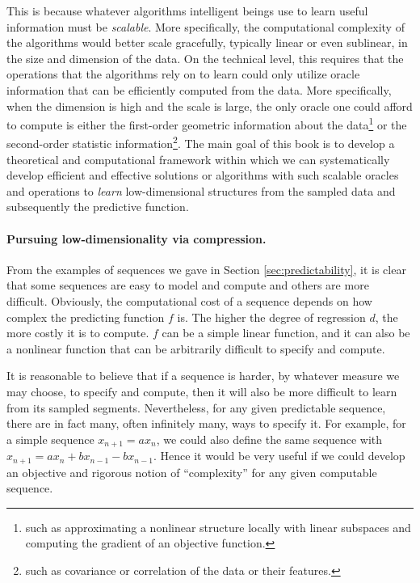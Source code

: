 \documentclass[\toplevelprefix/book-main.tex]{subfiles}
\begin{document}
This is because whatever algorithms intelligent beings use to learn useful information must be {\em scalable}. More specifically, the computational complexity of the algorithms would better scale gracefully, typically linear or even sublinear, in the size and dimension of the data. On the technical level, this requires that the operations that the algorithms rely on to learn could only utilize oracle information that can be efficiently computed from the data. More specifically, when the dimension is high and the scale is large, the only oracle one could afford to compute is either the first-order geometric information about the data\footnote{such as approximating a nonlinear structure locally with linear subspaces and computing the gradient of an objective function.} or the second-order statistic information\footnote{such as covariance or correlation of the data or their features.}.
The main goal of this book is to develop a theoretical and computational framework within which we can systematically develop efficient and effective solutions or algorithms with such scalable oracles and operations to {\em learn} low-dimensional structures from the sampled data and subsequently the predictive function.


\paragraph{Pursuing low-dimensionality via compression.}
From the examples of sequences we gave in Section \ref{sec:predictability}, it is clear that some sequences are easy to model and compute and others are more difficult. Obviously, the computational cost of a sequence depends on how complex the predicting function $f$ is. The higher the degree of regression $d$, the more costly it is to compute. $f$ can be a simple linear function, and it can also be a nonlinear function that can be arbitrarily difficult to specify and compute. 

It is reasonable to believe that if a sequence is harder, by whatever measure we may choose, to specify and compute, then it will also be more difficult to learn from its sampled segments. Nevertheless, for any given predictable sequence, there are in fact many, often infinitely many, ways to specify it. For example, for a simple sequence $x_{n+1} = a x_{n}$, we could also define the same sequence with $x_{n+1} = a x_n + b x_{n-1} - b x_{n-1}.$
Hence it would be very useful if we could develop an objective and rigorous notion of ``complexity'' for any given computable sequence. 
\end{document}
